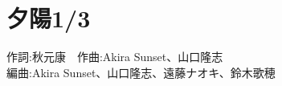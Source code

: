 \section{夕陽1/3}

\begin{center}
    \scriptsize{
        作詞:秋元康　作曲:Akira Sunset、山口隆志　\\
        編曲:Akira Sunset、山口隆志、遠藤ナオキ、鈴木歌穂
    }
\end{center}

\vspace{0.7em}

\begin{Parallel}[c]{0.47\textwidth}{0.47\textwidth}

\ParallelLText{
    \footnotesize{
        
    }
}

\ParallelRText{
    \footnotesize{
        
    }
}

\end{Parallel}
